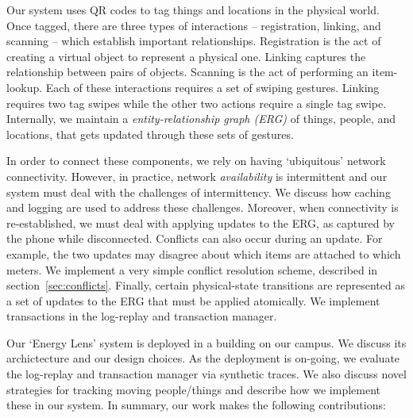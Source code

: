 Our system uses QR codes to tag things and locations in the physical world.  Once tagged, there are three types of interactions -- 
registration, linking, and scanning -- which establish important relationships.  Registration is the act of creating a virtual object 
to represent a physical one.  Linking captures the relationship between pairs of objects.  Scanning is the act of performing an item-lookup.
Each of these interactions requires a set of swiping gestures.  Linking requires two tag swipes while the other two actions
require a single tag swipe.  Internally, we maintain a \emph{entity-relationship graph (ERG)} of things, people, and locations, that gets
updated through these sets of gestures.

In order to connect these components, we rely on having `ubiquitous' network connectivity.  However, in practice, network
\emph{availability} is intermittent and our system must deal with the challenges of intermittency.  We discuss how caching
and logging are used to address these challenges.  Moreover, when connectivity is re-established, we must deal with
applying updates to the ERG, as captured by the phone while disconnected.  
Conflicts can also occur during an update.  For example, the two updates may disagree about which items are attached
to which meters.  We implement a very simple conflict resolution scheme, described in section~\ref{sec:conflicts}.
Finally, certain physical-state transitions are represented as a set of updates to the ERG that must be applied 
atomically.  We implement transactions in the log-replay and transaction manager.

Our `Energy Lens' system is deployed in a building on our campus.  We discuss
its archictecture and our design choices.  As the deployment is on-going, we evaluate the log-replay and 
transaction manager via synthetic traces.  %
We also discuss novel strategies for tracking moving people/things and describe how we implement these in our system.  In summary, our work
makes the following contributions:

